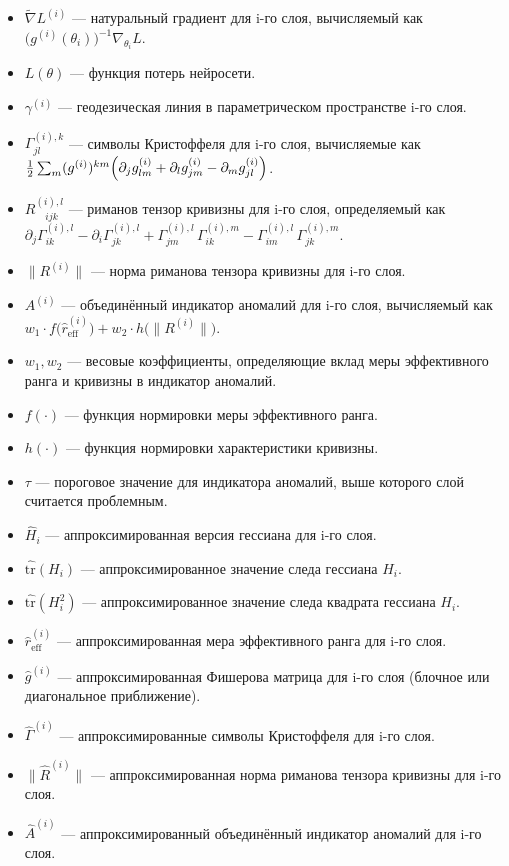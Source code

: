 \documentclass[a4paper,12pt]{article}
\begin{document}
\begin{itemize}
    \item \(\tilde{\nabla} L^{(i)}\) --- натуральный градиент для i-го слоя, вычисляемый как \(\bigl(g^{(i)}(\theta_i)\bigr)^{-1}\nabla_{\theta_i} L\).
    \item \(L(\theta)\) --- функция потерь нейросети.
    \item \(\gamma^{(i)}\) --- геодезическая линия в параметрическом пространстве i-го слоя.
    \item \(\Gamma^{(i),k}_{jl}\) --- символы Кристоффеля для i-го слоя, вычисляемые как \(\frac{1}{2}\sum_{m}(g^{(i)})^{km}\Bigl(\partial_j g^{(i)}_{lm} + \partial_l g^{(i)}_{jm} - \partial_m g^{(i)}_{jl}\Bigr)\).
    \item \(R^{(i),l}_{\quad ijk}\) --- риманов тензор кривизны для i-го слоя, определяемый как \(\partial_j \Gamma^{(i),l}_{ik} - \partial_i \Gamma^{(i),l}_{jk} + \Gamma^{(i),l}_{jm}\,\Gamma^{(i),m}_{ik} - \Gamma^{(i),l}_{im}\,\Gamma^{(i),m}_{jk}\).
    \item \(\|R^{(i)}\|\) --- норма риманова тензора кривизны для i-го слоя.
    \item \(A^{(i)}\) --- объединённый индикатор аномалий для i-го слоя, вычисляемый как \(w_1 \cdot f\bigl(\hat{r}_{\text{eff}}^{(i)}\bigr) + w_2 \cdot h\bigl(\|R^{(i)}\|\bigr)\).
    \item \(w_1, w_2\) --- весовые коэффициенты, определяющие вклад меры эффективного ранга и кривизны в индикатор аномалий.
    \item \(f(\cdot)\) --- функция нормировки меры эффективного ранга.
    \item \(h(\cdot)\) --- функция нормировки характеристики кривизны.
    \item \(\tau\) --- пороговое значение для индикатора аномалий, выше которого слой считается проблемным.
    \item \(\hat{H}_i\) --- аппроксимированная версия гессиана для i-го слоя.
    \item \(\widehat{\mathrm{tr}}(H_i)\) --- аппроксимированное значение следа гессиана \(H_i\).
    \item \(\widehat{\mathrm{tr}}(H_i^2)\) --- аппроксимированное значение следа квадрата гессиана \(H_i\).
    \item \(\widehat{r}_{\text{eff}}^{(i)}\) --- аппроксимированная мера эффективного ранга для i-го слоя.
    \item \(\hat{g}^{(i)}\) --- аппроксимированная Фишерова матрица для i-го слоя (блочное или диагональное приближение).
    \item \(\hat{\Gamma}^{(i)}\) --- аппроксимированные символы Кристоффеля для i-го слоя.
    \item \(\|\hat{R}^{(i)}\|\) --- аппроксимированная норма риманова тензора кривизны для i-го слоя.
    \item \(\hat{A}^{(i)}\) --- аппроксимированный объединённый индикатор аномалий для i-го слоя.
\end{itemize}
\end{document}
